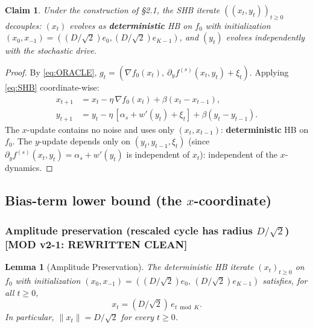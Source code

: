 \documentclass[11pt,a4paper]{article}
\theoremstyle{plain}
\newtheorem{lemma}[theorem]{Lemma}
\newtheorem{claim}[theorem]{Claim}
\theoremstyle{definition}
\theoremstyle{remark}
\begin{document}
\begin{claim}
\label{cla:2.5}
Under the construction of \S2.1, the SHB iterate $((x_t, y_t))_{t\geq 0}$ decouples: $(x_t)$ evolves as \textbf{deterministic} HB on $f_0$ with initialization $(x_0, x_{-1}) = ((D/\sqrt 2) e_0, (D/\sqrt 2) e_{K-1})$, and $(y_t)$ evolves independently with the stochastic drive.
\end{claim}

\begin{proof}
By \eqref{eq:ORACLE}, $g_t = (\nabla f_0(x_t),\ \partial_y f^{(s)}(x_t, y_t) + \xi_t)$. Applying \eqref{eq:SHB} coordinate-wise:
\begin{align*}
x_{t+1} &= x_t - \eta\,\nabla f_0(x_t) + \beta(x_t - x_{t-1}),\\
y_{t+1} &= y_t - \eta\,[\alpha_s + w'(y_t) + \xi_t] + \beta(y_t - y_{t-1}).
\end{align*}
The $x$-update contains no noise and uses only $(x_t, x_{t-1})$: \textbf{deterministic} HB on $f_0$. The $y$-update depends only on $(y_t, y_{t-1}, \xi_t)$ (since $\partial_y f^{(s)}(x_t, y_t) = \alpha_s + w'(y_t)$ is independent of $x_t$): independent of the $x$-dynamics.
\end{proof}

\subsection{Bias-term lower bound (the $x$-coordinate)}

\subsubsection{Amplitude preservation (rescaled cycle has radius $D/\sqrt 2$) \textbf{[MOD v2-1: REWRITTEN CLEAN]}}

\begin{lemma}[Amplitude Preservation]
\label{lem:2.6}
The deterministic HB iterate $(x_t)_{t \geq 0}$ on $f_0$ with initialization $(x_0, x_{-1}) = ((D/\sqrt 2) e_0,\, (D/\sqrt 2) e_{K-1})$ satisfies, for all $t \geq 0$,
\[
x_t = (D/\sqrt 2)\, e_{t \bmod K}.
\]
In particular, $\|x_t\| = D/\sqrt 2$ for every $t \geq 0$.
\end{lemma}
\end{document}
